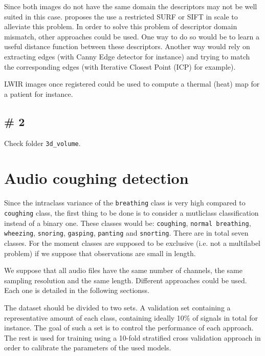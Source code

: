\documentclass[10pt]{article}
\begin{document}
            Since both images do not have the same domain the descriptors may not be well suited in this case.
            \cite{huo2011multilevel} proposes the use a restricted SURF or SIFT in scale to alleviate this problem.
            In order to solve this problem of descriptor domain mismatch, other approaches could be used.
            One way to do so would be to learn a useful distance function between these descriptors.
            Another way would rely on extracting edges (with Canny Edge detector for instance) and trying to match the corresponding edges (with Iterative Closest Point (ICP) for example).

            LWIR images once registered could be used to compute a thermal (heat) map for a patient for instance.
        
        \subsection*{\# 2}
            Check folder \texttt{3d\_volume}.

    \section*{Audio coughing detection}
        Since the intraclass variance of the \texttt{breathing} class is very high compared to \texttt{coughing} class, the first thing to be done is to consider a mutliclass classification instead of a binary one.
        These classes would be: \texttt{coughing}, \texttt{normal breathing}, \texttt{wheezing}, \texttt{snoring}, \texttt{gasping}, \texttt{panting} and \texttt{snorting}.
        There are in total seven classes.
        For the moment classes are supposed to be exclusive (i.e. not a multilabel problem) if we suppose that observations are small in length.

        We suppose that all audio files have the same number of channels, the same sampling resolution and the same length.
        Different approaches could be used.
        Each one is detailed in the following sectionss.

        The dataset should be divided to two sets.
        A validation set containing a representative amount of each class, containing ideally 10\% of signals in total for instance.
        The goal of such a set is to control the performance of each approach.
        The rest is used for training using a 10-fold stratified cross validation approach in order to calibrate the parameters of the used models.
\end{document}

